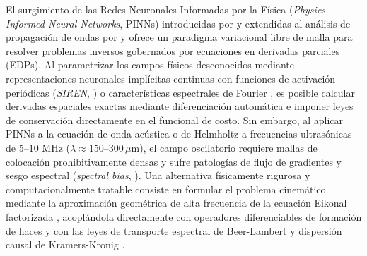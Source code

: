 \documentclass[9pt]{article}
\begin{document}
El surgimiento de las Redes Neuronales Informadas por la Física (\textit{Physics-Informed Neural Networks}, PINNs) introducidas por \textcite{Raissi2019} y extendidas al análisis de propagación de ondas por \textcite{Karniadakis2021} y \textcite{RashtBehesht2022} ofrece un paradigma variacional libre de malla para resolver problemas inversos gobernados por ecuaciones en derivadas parciales (EDPs). Al parametrizar los campos físicos desconocidos mediante representaciones neuronales implícitas continuas con funciones de activación periódicas (\textit{SIREN}, \cite{Sitzmann2020}) o características espectrales de Fourier \parencite{Tancik2020}, es posible calcular derivadas espaciales exactas mediante diferenciación automática e imponer leyes de conservación directamente en el funcional de costo. Sin embargo, al aplicar PINNs a la ecuación de onda acústica o de Helmholtz a frecuencias ultrasónicas de $5\text{--}10\text{ MHz}$ ($\lambda \approx 150\text{--}300\,\mu\text{m}$), el campo oscilatorio requiere mallas de colocación prohibitivamente densas y sufre patologías de flujo de gradientes y sesgo espectral (\textit{spectral bias}, \cite{Wang2021, Song2021}). Una alternativa físicamente rigurosa y computacionalmente tratable consiste en formular el problema cinemático mediante la aproximación geométrica de alta frecuencia de la ecuación Eikonal factorizada \parencite{Fomel2009, Waheed2021, Smith2021}, acoplándola directamente con operadores diferenciables de formación de haces y con las leyes de transporte espectral de Beer-Lambert y dispersión causal de Kramers-Kronig \parencite{ODonnell1981, Waters2000}.
\end{document}
